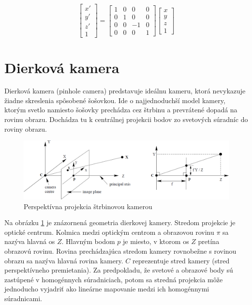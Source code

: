 \begin{equation}
\label{eq_kalib_sumer_z}
\begin{aligned}
\begin{bmatrix}
x' \\ y' \\ z' \\ 1 
\end{bmatrix}
=
\begin{bmatrix}
1 & 0 & 0 & 0 \\
0 & 1 & 0 & 0 \\
0 & 0 & -1 & 0 \\
0 & 0 & 0 & 1 
\end{bmatrix}
\begin{bmatrix}
x \\ y \\ z \\ 1 
\end{bmatrix}
\end{aligned}
\end{equation}




\section{Dierková kamera}
Dierková kamera (pinhole camera) predstavuje ideálnu kameru, ktorá nevykazuje žiadne skreslenia spôsobené šošovkou. Ide o najjednoduchší model kamery, ktorým svetlo namiesto šošovky prechádza cez štrbinu a prevrátené dopadá na rovinu obrazu. Dochádza tu k centrálnej projekcii bodov zo svetových súradníc do roviny obrazu.

\begin{figure}[h]
	\centering
	\includegraphics[width=\textwidth]{figures/pinhole_camera.jpg} 
	\caption{Perspektívna projekcia štrbinovou kamerou}
	\label{fig:pinhole_camera}
\end{figure}

Na obrázku \ref{fig:pinhole_camera} je znázornená geometria dierkovej kamery. Stredom projekcie je optické centrum. Kolmica medzi optickým centrom a obrazovou rovinu $\pi$ sa nazýva hlavná os $Z$. Hlavným bodom $p$ je miesto, v ktorom os $Z$ pretína obrazovú rovinu. Rovina prechádzajúca stredom kamery rovnobežne s rovinou obrazu sa nazýva hlavná rovina kamery. $C$ reprezentuje stred kamery (stred perspektívneho premietania). Za predpokladu, že svetové a obrazové body sú zastúpené v homogénnych súradniciach, potom sa stredná projekcia môže jednoducho vyjadriť ako lineárne mapovanie medzi ich homogénnymi súradnicami.

